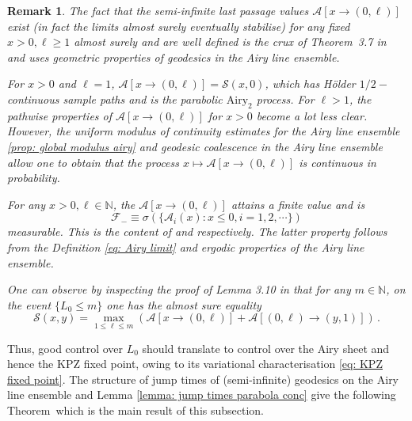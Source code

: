 \documentclass[11pt, reqno]{amsart}
\numberwithin{equation}{section}
\newtheorem*{remark}{Remark}
\newcommand{\N}{\ensuremath{\mathbb{N}}}
\begin{document}
\begin{remark}
    The fact that the semi-infinite last passage values $\mathcal{A}[x \to (0, \ell)]$ exist (in fact the limits almost surely eventually stabilise) for any fixed $x> 0, \ell \ge 1$ almost surely and are well defined is the crux of Theorem~3.7 in \cite{sarkar2021brownian} and uses geometric properties of geodesics in the Airy line ensemble.

    For $x> 0$ and $\ell = 1$, $ \mathcal{A}[x\to(0,\ell)] = \mathcal{S}(x,0)$, which has H\"older $1/2-$ continuous sample paths and is the parabolic $\text{Airy}_{2}$ process. For $\ell >1$, the pathwise properties of $ \mathcal{A}[x\to(0,\ell)]$ for $x>0$ become a lot less clear. However, the uniform modulus of continuity estimates for the Airy line ensemble \ref{prop: global modulus airy} and geodesic coalescence in the Airy line ensemble allow one to obtain that the process $x\mapsto \mathcal{A}[x\to(0,\ell)]$ is \emph{continuous in probability}. 

    For any $x> 0, \ell\in\N$, the $\mathcal{A}[x\to(0,\ell)]$ attains a finite value and is
    \[
    \mathcal{F}_{-}\equiv \sigma(\{\mathcal{A}_i(x):x\leq0,i=1,2,\cdots\})
    \]
    measurable. This is the content of \cite[Lemma 3.8]{sarkar2021brownian} and \cite[Lemma 3.9]{sarkar2021brownian} respectively. The latter property follows from the Definition \ref{eq: Airy limit} and ergodic properties of the Airy line ensemble.

    One can observe by inspecting the proof of Lemma 3.10 in \cite{sarkar2021brownian} that for any $m\in \N $, on the event $\{L_0\leq m\}$ one has the almost sure equality 
    \begin{equation*}
    \mathcal{S}(x,y) = \max_{1\le \ell\le m}(\mathcal{A}[x\to(0,\ell)]+\mathcal{A}[(0,\ell)\to (y,1)])\,.
    \end{equation*}
\end{remark}

Thus, good control over $L_0$ should translate to control over the Airy sheet and hence the KPZ fixed point, owing to its variational characterisation \eqref{eq: KPZ fixed point}. The structure of jump times of (semi-infinite) geodesics on the Airy line ensemble and Lemma \ref{lemma: jump times parabola conc} give the following Theorem~which is the main result of this subsection.
\end{document}
